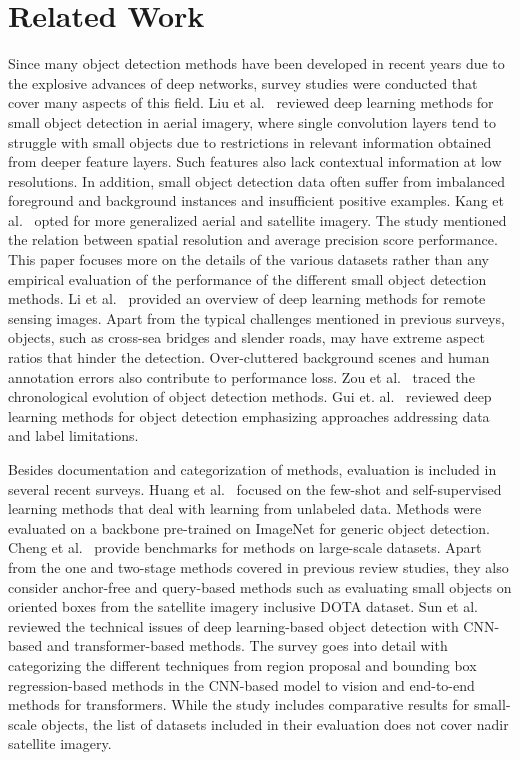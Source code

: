 \documentclass{article}
\begin{document}
\section{Related Work
\label{sec:RelatedWork}}


Since many object detection methods have been developed in recent years due to the explosive advances of deep networks, survey studies were conducted that cover many aspects of this field. Liu et al.~\cite{2021Liu} reviewed deep learning methods for small object detection in aerial imagery, where single convolution layers tend to struggle with small objects due to restrictions in relevant information obtained from deeper feature layers. Such features also lack contextual information at low resolutions. In addition, small object detection data often suffer from imbalanced foreground and background instances and insufficient positive examples. 
Kang et al.~\cite{2022Kang} opted for more generalized aerial and satellite imagery. The study mentioned the relation between spatial resolution and average precision score performance.
This paper focuses more on the details of the various datasets rather than any empirical evaluation of the performance of the different small object detection methods.
Li et al.~\cite{2022Li} provided an overview of deep learning methods for remote sensing images. Apart from the typical challenges mentioned in previous surveys, objects, such as cross-sea bridges and slender roads, may have extreme aspect ratios that hinder the detection. Over-cluttered background scenes and human annotation errors also contribute to performance loss.
Zou et al.~\cite{2023Zou} traced the chronological evolution of object detection methods. %
Gui et. al.~\cite{2024Gui} reviewed deep learning methods for object detection emphasizing approaches addressing data and label limitations.

Besides documentation and categorization of methods, evaluation is included in several recent surveys. Huang et al.~\cite{2023Huang} focused on the few-shot and self-supervised learning methods that deal with learning from unlabeled data. Methods were evaluated on a backbone pre-trained on ImageNet for generic object detection.
Cheng et al.~\cite{2023Cheng} provide benchmarks for methods on large-scale datasets. Apart from the one and two-stage methods covered in previous review studies, they also consider anchor-free and query-based methods such as evaluating small objects on oriented boxes from the satellite imagery inclusive DOTA dataset. 
Sun et al.~\cite{2024Sun} reviewed the technical issues of deep learning-based object detection with CNN-based and transformer-based methods. The survey goes into detail with categorizing the different techniques from region proposal and bounding box regression-based methods in the CNN-based model to vision and end-to-end methods for transformers.
While the study includes comparative results for small-scale objects, the list of datasets included in their evaluation does not cover nadir satellite imagery.
\end{document}
